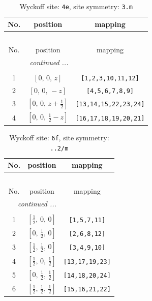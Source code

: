 \documentclass[fleqn,8pt]{jsarticle}
\begin{document}
\renewcommand{\arraystretch}{1.2}
\begin{longtable}{ccc}
\caption{Wyckoff site: {\tt 4e}, site symmetry: {\tt 3.m}}
 \\
 \hline \hline
No. & position & mapping \\ \hline \endfirsthead

\multicolumn{2}{l}{\tablename\ \thetable{}} \\
 \hline \hline
No. & position & mapping \\ \hline \endhead

 \hline \hline
\multicolumn{2}{r}{\footnotesize\it continued ...} \\ \endfoot

 \hline \hline
\multicolumn{2}{r}{} \\ \endlastfoot

1 & $\left[ 0,\, 0,\, z \right]$ & {\tt [1,2,3,10,11,12]} \\ \hline
2 & $\left[ 0,\, 0,\, - z \right]$ & {\tt [4,5,6,7,8,9]} \\ \hline
3 & $\left[ 0,\, 0,\, z + \frac{1}{2} \right]$ & {\tt [13,14,15,22,23,24]} \\ \hline
4 & $\left[ 0,\, 0,\, \frac{1}{2} - z \right]$ & {\tt [16,17,18,19,20,21]} \\
\end{longtable}
\renewcommand{\arraystretch}{1.2}
\begin{longtable}{ccc}
\caption{Wyckoff site: {\tt 6f}, site symmetry: {\tt ..2/m}}
 \\
 \hline \hline
No. & position & mapping \\ \hline \endfirsthead

\multicolumn{2}{l}{\tablename\ \thetable{}} \\
 \hline \hline
No. & position & mapping \\ \hline \endhead

 \hline \hline
\multicolumn{2}{r}{\footnotesize\it continued ...} \\ \endfoot

 \hline \hline
\multicolumn{2}{r}{} \\ \endlastfoot

1 & $\left[ \frac{1}{2},\, 0,\, 0 \right]$ & {\tt [1,5,7,11]} \\ \hline
2 & $\left[ 0,\, \frac{1}{2},\, 0 \right]$ & {\tt [2,6,8,12]} \\ \hline
3 & $\left[ \frac{1}{2},\, \frac{1}{2},\, 0 \right]$ & {\tt [3,4,9,10]} \\ \hline
4 & $\left[ \frac{1}{2},\, 0,\, \frac{1}{2} \right]$ & {\tt [13,17,19,23]} \\ \hline
5 & $\left[ 0,\, \frac{1}{2},\, \frac{1}{2} \right]$ & {\tt [14,18,20,24]} \\ \hline
6 & $\left[ \frac{1}{2},\, \frac{1}{2},\, \frac{1}{2} \right]$ & {\tt [15,16,21,22]} \\
\end{longtable}
\end{document}
